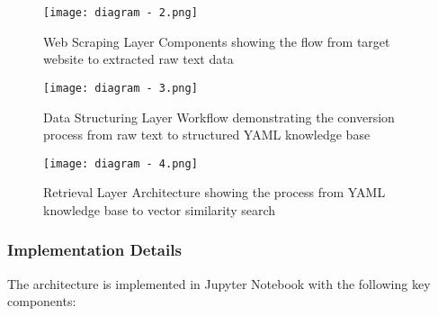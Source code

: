 \documentclass[12pt,a4paper]{report}
\begin{document}
    \begin{figure}[htbp]
    \centering
    \texttt{[image: diagram - 2.png]}
    \caption{ Web Scraping Layer Components showing the flow from target website to extracted raw text data}
    \label{fig:web-scrapping layer}
    \end{figure}


    \begin{figure}[htbp]
    \centering
    \texttt{[image: diagram - 3.png]}
    \caption{ Data Structuring Layer Workflow demonstrating the conversion process from raw text to structured YAML knowledge base}
    \label{fig:Data Structuring layer}
    \end{figure}   

    \begin{figure}[htbp]
    \centering
    \texttt{[image: diagram - 4.png]}
    \caption{Retrieval Layer Architecture showing the process from YAML knowledge base to vector similarity search}
    \label{fig:Retrieval layer}
    \end{figure}



\subsubsection{Implementation Details}
The architecture is implemented in Jupyter Notebook with the following key components:
\end{document}
